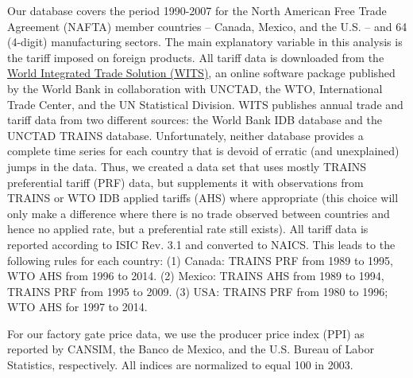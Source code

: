 Our database covers the period 1990-2007 for the North American Free Trade Agreement 
(NAFTA) member countries -- Canada, Mexico, and the U.S. -- and 64 (4-digit) manufacturing sectors. 
The main explanatory variable in this analysis is the tariff imposed on foreign 
products. All tariff data is downloaded from the \href{http://wits.worldbank.org/Default.aspx}{World Integrated Trade Solution (WITS)},
 an online software package published by the World Bank in collaboration with 
UNCTAD, the WTO, International Trade Center, and the UN Statistical Division. 
WITS publishes annual trade and tariff data from two different sources: the World
 Bank IDB database and the UNCTAD TRAINS database. Unfortunately, neither database 
provides a complete time series for each country that is devoid of erratic 
(and unexplained) jumps in the data. Thus, we created a data set that uses mostly 
TRAINS preferential tariff (PRF) data, but supplements it with observations from 
TRAINS or WTO IDB applied tariffs (AHS) where appropriate (this choice will only 
make a difference where there is no trade observed between countries and hence 
no applied rate, but a preferential rate still exists). All tariff data is reported 
according to ISIC Rev. 3.1 and converted to NAICS. This leads to the following 
rules for each country: (1) Canada: TRAINS PRF from 1989 to 1995, WTO AHS from 
1996 to 2014. (2) Mexico: TRAINS AHS from 1989 to 1994, TRAINS PRF from 1995 to 2009. 
(3) USA: TRAINS PRF from 1980 to 1996; WTO AHS for 1997 to 2014.

For our factory gate price data, we use the producer price index (PPI) as reported 
by CANSIM, the Banco de Mexico, and the U.S. Bureau of Labor Statistics, respectively.
 All indices are normalized to equal 100 in 2003.

